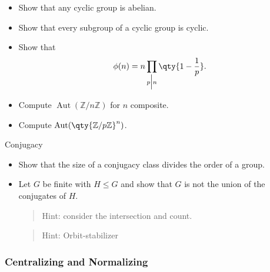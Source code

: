 \begin{itemize}
\tightlist
\item
  Show that any cyclic group is abelian.
\item
  Show that every subgroup of a cyclic group is cyclic.
\item
  Show that
  \begin{align*}\phi(n) = n \prod_{p\mathrel{\Big|}n}\qty{1 - {1\over p}}.\end{align*}
\item
  Compute \(\operatorname{Aut}({\mathbb{Z}}/n{\mathbb{Z}})\) for \(n\)
  composite.
\item
  Compute \(\operatorname{Aut}(\qty{{\mathbb{Z}}/p{\mathbb{Z}}}^n)\).
\end{itemize}

Conjugacy

\begin{itemize}
\item
  Show that the size of a conjugacy class divides the order of a group.
\item
  Let \(G\) be finite with \(H\leq G\) and show that \(G\) is not the
  union of the conjugates of \(H\).

  \begin{quote}
  Hint: consider the intersection and count.
  \end{quote}

  \begin{quote}
  Hint: Orbit-stabilizer
  \end{quote}
\end{itemize}

\hypertarget{centralizing-and-normalizing}{%
\subsubsection{Centralizing and
Normalizing}\label{centralizing-and-normalizing}}

